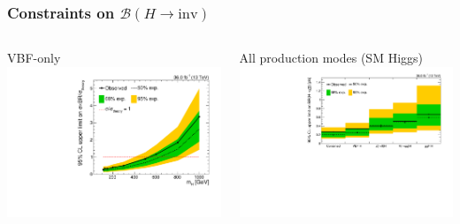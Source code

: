 \documentclass[aspectratio=169,xcolor=dvipsnames,,table,compress]{beamer}
\begin{document}
\begin{frame} \frametitle{Constraints on $\mathcal{B}(H\rightarrow\mathrm{inv})$}
  \vspace{-5mm}
  \begin{columns}[T]
    \begin{column}{0.4\textwidth}
      \centering
      VBF-only \\ 
        {\includegraphics[width=\textwidth]{../figures/vbf/fits/mhscan_ggf.pdf}}
    \end{column}
    \begin{column}{0.6\textwidth}
      \centering
      All production modes (SM Higgs) \\ 
        \includegraphics[width=\textwidth]{../figures/vbf/fits/comb.pdf}
    \end{column}
  \end{columns}
\end{frame}
 
\end{document}

